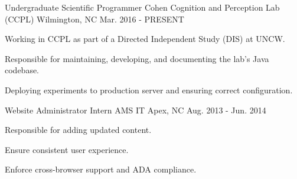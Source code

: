 \begin{cventries}
  \cventry
    {Undergraduate Scientific Programmer} %
    {Cohen Cognition and Perception Lab (CCPL)} %
    {Wilmington, NC} %
    {Mar. 2016 - PRESENT} %
    {
      \begin{cvitems}
        \item {Working in CCPL as part of a Directed Independent Study (DIS) at UNCW.}
        \item {Responsible for maintaining, developing, and documenting the lab's Java codebase.}
        \item {Deploying experiments to production server and ensuring correct configuration.}
      \end{cvitems}
    }
  \cventry
    {Website Administrator Intern} %
    {AMS IT} %
    {Apex, NC} %
    {Aug. 2013 - Jun. 2014} %
    {
      \begin{cvitems}
        \item {Responsible for adding updated content.}
        \item {Ensure consistent user experience.}
        \item {Enforce cross-browser support and ADA compliance.}
      \end{cvitems}
    }
\end{cventries}
